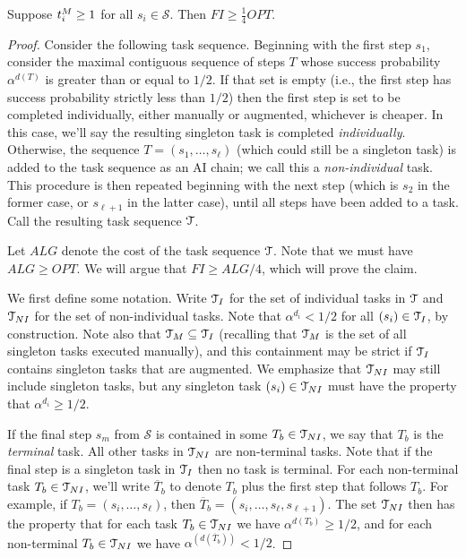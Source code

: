 \begin{lem}
\label{lem:FI.lower.bound.4}
    Suppose $t^{M}_{i} \geq 1$ for all $s_i \in \mathcal{S}$.
    Then $FI \geq \tfrac{1}{4}OPT$.
\end{lem}
\begin{proof}

    Consider the following task sequence.
    Beginning with the first step $s_1$, consider the maximal contiguous sequence of steps $T$ whose success probability $\alpha^{d(T)}$ is greater than or equal to $1/2$.
    If that set is empty (i.e., the first step has success probability strictly less than $1/2$) then the first step is set to be completed individually, either manually or augmented, whichever is cheaper.
    In this case, we'll say the resulting singleton task is completed \emph{individually}.
    Otherwise, the sequence $T = (s_1, \dotsc, s_\ell)$ (which could still be a singleton task) is added to the task sequence as an AI chain; we call this a \emph{non-individual} task.
    This procedure is then repeated beginning with the next step (which is $s_2$ in the former case, or $s_{\ell+1}$ in the latter case), until all steps have been added to a task.
    Call the resulting task sequence $\mathcal{T}$.

    \medskip

    Let $ALG$ denote the cost of the task sequence $\mathcal{T}$.
    Note that we must have $ALG \geq OPT$.
    We will argue that $FI \geq ALG/4$, which will prove the claim.

    \medskip

    We first define some notation.
    Write $\mathcal{T}_I$ for the set of individual tasks in $\mathcal{T}$ and $\mathcal{T}_{NI}$ for the set of non-individual tasks.
    Note that $\alpha^{d_i} < 1/2$ for all $(s_i) \in \mathcal{T}_I$, by construction.
    Note also that $\mathcal{T}_{M} \subseteq \mathcal{T}_I$ (recalling that $\mathcal{T}_{M}$ is the set of all singleton tasks executed manually), and this containment may be strict if $\mathcal{T}_I$ contains singleton tasks that are augmented.
    We emphasize that $\mathcal{T}_{NI}$ may still include singleton tasks, but any singleton task $(s_i) \in \mathcal{T}_{NI}$ must have the property that $\alpha^{d_i} \geq 1/2$.

    If the final step $s_m$ from $\mathcal{S}$ is contained in some $T_b \in \mathcal{T}_{NI}$, we say that $T_b$ is the \emph{terminal} task.
    All other tasks in $\mathcal{T}_{NI}$ are non-terminal tasks.
Note that if the final step is a singleton task in $\mathcal{T}_I$ then no task is terminal.
    For each non-terminal task $T_b \in \mathcal{T}_{NI}$, we'll write $\overline{T}_b$ to denote $T_b$ plus the first step that follows $T_b$.
    For example, if $T_b = (s_i, \dotsc, s_\ell)$, then $\overline{T}_b = (s_i, \dotsc, s_\ell, s_{\ell+1})$.
    The set $\mathcal{T}_{NI}$ then has the property that for each task $T_b \in \mathcal{T}_{NI}$ we have $\alpha^{d(T_b)} \geq 1/2$, and for each non-terminal $T_b \in \mathcal{T}_{NI}$ we have $\alpha^{(d(\overline{T}_b))} < 1/2$.


\end{proof}
